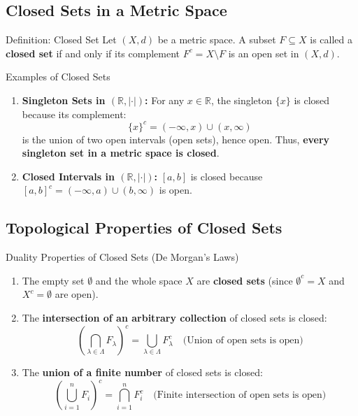 \documentclass[11pt,a4paper]{article}
\begin{document}
\newpage

\subsection{Closed Sets in a Metric Space}

\begin{defbox}{Definition: Closed Set}
Let $(X, d)$ be a metric space. A subset $F \subseteq X$ is called a \textbf{closed set} if and only if its complement $F^c = X \setminus F$ is an open set in $(X, d)$.
\end{defbox}

\begin{exbox}{Examples of Closed Sets}
\begin{enumerate}
    \item \textbf{Singleton Sets in $(\mathbb{R}, |\cdot|)$:}
    For any $x \in \mathbb{R}$, the singleton $\{x\}$ is closed because its complement:
    $$\{x\}^c = (-\infty, x) \cup (x, \infty)$$
    is the union of two open intervals (open sets), hence open. Thus, \textbf{every singleton set in a metric space is closed}.
    
    \item \textbf{Closed Intervals in $(\mathbb{R}, |\cdot|)$:}
    $[a, b]$ is closed because $[a, b]^c = (-\infty, a) \cup (b, \infty)$ is open.
\end{enumerate}
\end{exbox}

\subsection{Topological Properties of Closed Sets}

\begin{formulabox}{Duality Properties of Closed Sets (De Morgan's Laws)}
\begin{enumerate}
    \item The empty set $\emptyset$ and the whole space $X$ are \textbf{closed sets} (since $\emptyset^c = X$ and $X^c = \emptyset$ are open).
    \item The \textbf{intersection of an arbitrary collection} of closed sets is closed:
    $$\left( \bigcap_{\lambda \in \Lambda} F_\lambda \right)^c = \bigcup_{\lambda \in \Lambda} F_\lambda^c \quad \text{(Union of open sets is open)}$$
    \item The \textbf{union of a finite number} of closed sets is closed:
    $$\left( \bigcup_{i=1}^n F_i \right)^c = \bigcap_{i=1}^n F_i^c \quad \text{(Finite intersection of open sets is open)}$$
\end{enumerate}
\end{formulabox}
\end{document}
